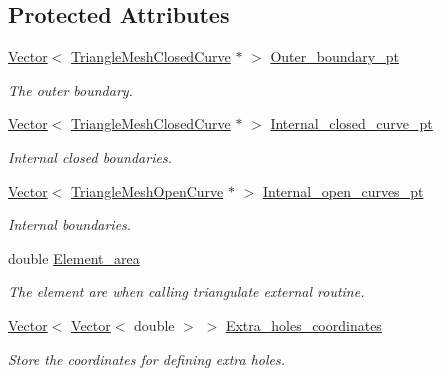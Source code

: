 \subsection*{Protected Attributes}
\begin{DoxyCompactItemize}
\item 
\hyperlink{classoomph_1_1Vector}{Vector}$<$ \hyperlink{classoomph_1_1TriangleMeshClosedCurve}{Triangle\+Mesh\+Closed\+Curve} $\ast$ $>$ \hyperlink{classoomph_1_1TriangleMeshParameters_ab68819894ffa01f268c2ef861a45e108}{Outer\+\_\+boundary\+\_\+pt}
\begin{DoxyCompactList}\small\item\em The outer boundary. \end{DoxyCompactList}\item 
\hyperlink{classoomph_1_1Vector}{Vector}$<$ \hyperlink{classoomph_1_1TriangleMeshClosedCurve}{Triangle\+Mesh\+Closed\+Curve} $\ast$ $>$ \hyperlink{classoomph_1_1TriangleMeshParameters_a99475f8749f590b46554e6e6d9e8af78}{Internal\+\_\+closed\+\_\+curve\+\_\+pt}
\begin{DoxyCompactList}\small\item\em Internal closed boundaries. \end{DoxyCompactList}\item 
\hyperlink{classoomph_1_1Vector}{Vector}$<$ \hyperlink{classoomph_1_1TriangleMeshOpenCurve}{Triangle\+Mesh\+Open\+Curve} $\ast$ $>$ \hyperlink{classoomph_1_1TriangleMeshParameters_af6a11e437a5c14d6c160160cf2a3c79a}{Internal\+\_\+open\+\_\+curves\+\_\+pt}
\begin{DoxyCompactList}\small\item\em Internal boundaries. \end{DoxyCompactList}\item 
double \hyperlink{classoomph_1_1TriangleMeshParameters_afb48563db8d81652f699b3bc5964c8e3}{Element\+\_\+area}
\begin{DoxyCompactList}\small\item\em The element are when calling triangulate external routine. \end{DoxyCompactList}\item 
\hyperlink{classoomph_1_1Vector}{Vector}$<$ \hyperlink{classoomph_1_1Vector}{Vector}$<$ double $>$ $>$ \hyperlink{classoomph_1_1TriangleMeshParameters_aa503725c7d6941b3b55d00498576ea5a}{Extra\+\_\+holes\+\_\+coordinates}
\begin{DoxyCompactList}\small\item\em Store the coordinates for defining extra holes. \end{DoxyCompactList}\item 

\end{DoxyCompactItemize}

